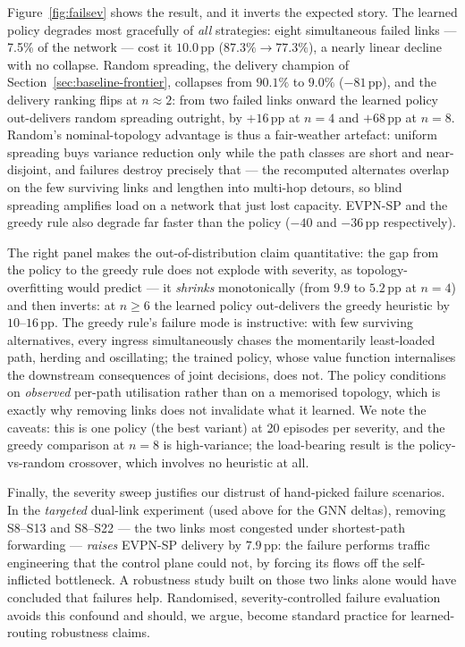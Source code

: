 \documentclass[10pt,journal,comsoc]{IEEEtran}
\begin{document}
Figure~\ref{fig:failsev} shows the result, and it inverts the expected story. The learned policy degrades most gracefully of \emph{all} strategies: eight simultaneous failed links --- 7.5\% of the network --- cost it $10.0$\,pp ($87.3\% \to 77.3\%$), a nearly linear decline with no collapse. Random spreading, the delivery champion of Section~\ref{sec:baseline-frontier}, collapses from $90.1\%$ to $9.0\%$ ($-81$\,pp), and the delivery ranking flips at $n \approx 2$: from two failed links onward the learned policy out-delivers random spreading outright, by $+16$\,pp at $n=4$ and $+68$\,pp at $n=8$. Random's nominal-topology advantage is thus a fair-weather artefact: uniform spreading buys variance reduction only while the path classes are short and near-disjoint, and failures destroy precisely that --- the recomputed alternates overlap on the few surviving links and lengthen into multi-hop detours, so blind spreading amplifies load on a network that just lost capacity. EVPN-SP and the greedy rule also degrade far faster than the policy ($-40$ and $-36$\,pp respectively).

The right panel makes the out-of-distribution claim quantitative: the gap from the policy to the greedy rule does not explode with severity, as topology-overfitting would predict --- it \emph{shrinks} monotonically (from $9.9$ to $5.2$\,pp at $n=4$) and then inverts: at $n \ge 6$ the learned policy out-delivers the greedy heuristic by $10$--$16$\,pp. The greedy rule's failure mode is instructive: with few surviving alternatives, every ingress simultaneously chases the momentarily least-loaded path, herding and oscillating; the trained policy, whose value function internalises the downstream consequences of joint decisions, does not. The policy conditions on \emph{observed} per-path utilisation rather than on a memorised topology, which is exactly why removing links does not invalidate what it learned. We note the caveats: this is one policy (the best variant) at 20 episodes per severity, and the greedy comparison at $n=8$ is high-variance; the load-bearing result is the policy-vs-random crossover, which involves no heuristic at all.

Finally, the severity sweep justifies our distrust of hand-picked failure scenarios. In the \emph{targeted} dual-link experiment (used above for the GNN deltas), removing S8--S13 and S8--S22 --- the two links most congested under shortest-path forwarding --- \emph{raises} EVPN-SP delivery by $7.9$\,pp: the failure performs traffic engineering that the control plane could not, by forcing its flows off the self-inflicted bottleneck. A robustness study built on those two links alone would have concluded that failures help. Randomised, severity-controlled failure evaluation avoids this confound and should, we argue, become standard practice for learned-routing robustness claims.
\end{document}
